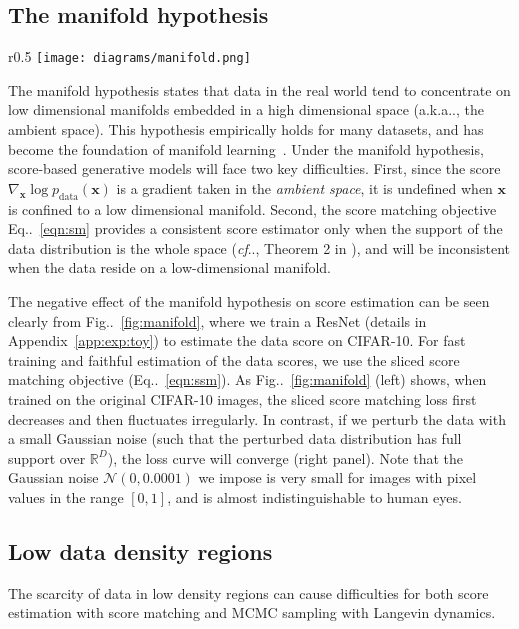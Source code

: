 \documentclass{article}
\makeatletter
\newcommand{\mbb}[1]{\mathbb{#1}}
\newcommand{\mcal}{\mathcal}
\def\@onedot{\ifx\@let@token.\else.\null\fi\xspace}
\DeclareRobustCommand\onedot{\futurelet\@let@token\@onedot}
\newcommand{\eqnref}[1]{Eq\onedot~\eqref{#1}}
\newcommand{\figref}[1]{Fig\onedot~\ref{#1}}
\newcommand{\bfx}{\mathbf{x}}
\def\cf{\emph{cf}\onedot}
\def\wrt{w.r.t\onedot}
\def\aka{a.k.a\onedot}
\makeatother
\begin{document}
\subsection{The manifold hypothesis}
\begin{wrapfigure}[11]{r}{0.5\textwidth}
    \centering
    \vspace{-1em}
    \texttt{[image: diagrams/manifold.png]}
    \caption{\textbf{Left}: Sliced score matching (SSM) loss \wrt iterations. No noise is added to data. \textbf{Right}: Same but data are perturbed with $\mcal{N}(0, 0.0001)$.}\label{fig:manifold}
\end{wrapfigure}
The manifold hypothesis states that data in the real world tend to concentrate on low dimensional manifolds embedded in a high dimensional space (\aka, the ambient space). This hypothesis empirically holds for many datasets, and has become the foundation of manifold learning~\cite{belkin2003laplacian,roweis2000nonlinear}. Under the manifold hypothesis, score-based generative models will face two key difficulties. First, since the score $\nabla_\bfx \log p_\text{data}(\bfx)$ is a gradient taken in the \emph{ambient space}, it is undefined when $\bfx$ is confined to a low dimensional manifold. Second, the score matching objective \eqnref{eqn:sm} provides a consistent score estimator only when the support of the data distribution is the whole space (\cf, Theorem 2 in \cite{hyvarinen2005estimation}), and will be inconsistent when the data reside on a low-dimensional manifold.

The negative effect of the manifold hypothesis on score estimation can be seen clearly from \figref{fig:manifold}, where we train a ResNet (details in Appendix~\ref{app:exp:toy}) to estimate the data score on CIFAR-10. For fast training and faithful estimation of the data scores, we use the sliced score matching objective (\eqnref{eqn:ssm}). As \figref{fig:manifold} (left) shows, when trained on the original CIFAR-10 images, the sliced score matching loss first decreases 
and then fluctuates irregularly. In contrast, if we perturb the data with a small Gaussian noise (such that the perturbed data distribution has full support over $\mbb{R}^D$), the loss curve will converge (right panel). Note that the Gaussian noise $\mcal{N}(0, 0.0001)$ we impose is very small for images with pixel values in the range $[0, 1]$, and is almost indistinguishable to human eyes.
\subsection{Low data density regions}\label{sec:low_density}
The scarcity of data in low density regions can cause difficulties for both score estimation with score matching and MCMC sampling with Langevin dynamics.
\end{document}
